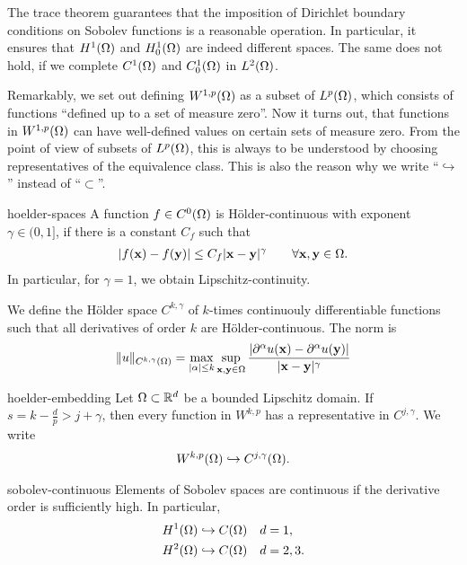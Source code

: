 \begin{remark}
  The trace theorem guarantees that the imposition of Dirichlet
  boundary conditions on Sobolev functions is a reasonable
  operation. In particular, it ensures that $H^1(\Omega)$ and
  $H^1_0(\Omega)$ are indeed different spaces. The same does not
  hold, if we complete $C^1(\Omega)$ and $C^1_0(\Omega)$ in
  $L^2(\Omega)$.

  Remarkably, we set out defining $W^{1,p}(\Omega)$ as a subset of
  $L^p(\Omega)$, which consists of functions ``defined up to a set of
  measure zero''. Now it turns out, that functions in
  $W^{1,p}(\Omega)$ can have well-defined values on certain sets of
  measure zero. From the point of view of subsets of $L^p(\Omega)$,
  this is always to be understood by choosing representatives of the
  equivalence class. This is also the reason why we write
  ``$\hookrightarrow$'' instead of ``$\subset$''.
\end{remark}

\begin{Definition}{hoelder-spaces}
  A function $f \in C^0(\Omega)$ is Hölder-continuous with exponent
  $\gamma \in (0,1]$, if there is a constant $C_f$ such that
  \begin{gather}
    \lvert f(\mathbf x)-f(\mathbf y)\rvert \le C_f \lvert\mathbf x-\mathbf y\rvert^\gamma
    \qquad\forall \mathbf x,\mathbf y\in\Omega.
  \end{gather}
  In particular, for $\gamma = 1$, we obtain Lipschitz-continuity.

  We define the Hölder space $C^{k,\gamma}$ of $k$-times continuouly
  differentiable functions such that all derivatives of order $k$ are
  Hölder-continuous. The norm is
  \begin{gather}
    \lVert u\rVert_{C^{k,\gamma}(\Omega)} = \max_{\lvert\alpha\rvert\le k} \sup_{\mathbf x,\mathbf y\in\Omega}
    \frac{\lvert\partial^\alpha u(\mathbf x)-\partial^\alpha u(\mathbf y)\rvert}{\lvert\mathbf x-\mathbf y\rvert^\gamma}
  \end{gather}
\end{Definition}

\begin{Theorem}{hoelder-embedding}
  Let $\Omega\subset\mathbb R^d$ be a bounded Lipschitz domain.
  If $s = k-\tfrac dp > j+\gamma$, then every function in $W^{k,p}$ has a
  representative in $C^{j,\gamma}$. We write
  \begin{gather}
    W^{k,p}(\Omega) \hookrightarrow C^{j,\gamma}(\Omega).
  \end{gather}
\end{Theorem}

\begin{Corollary}{sobolev-continuous}
  Elements of Sobolev spaces are continuous if the derivative
  order is sufficiently high. In particular,
  \begin{gather}
    \begin{aligned}
      H^1(\Omega) & \hookrightarrow C(\Omega) & d&= 1, \\
      H^2(\Omega) & \hookrightarrow C(\Omega) & d&= 2,3.
    \end{aligned}
  \end{gather}
\end{Corollary}


